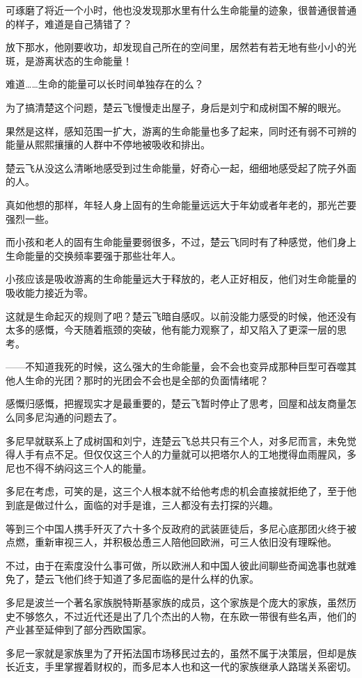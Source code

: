 可琢磨了将近一个小时，他也没发现那水里有什么生命能量的迹象，很普通很普通的样子，难道是自己猜错了？

放下那水，他刚要收功，却发现自己所在的空间里，居然若有若无地有些小小的光斑，是游离状态的生命能量！

难道……生命的能量可以长时间单独存在的么？

为了搞清楚这个问题，楚云飞慢慢走出屋子，身后是刘宁和成树国不解的眼光。

果然是这样，感知范围一扩大，游离的生命能量也多了起来，同时还有弱不可辨的能量从熙熙攘攘的人群中不停地被吸收和排出。

楚云飞从没这么清晰地感受到过生命能量，好奇心一起，细细地感受起了院子外面的人。

真如他想的那样，年轻人身上固有的生命能量远远大于年幼或者年老的，那光芒要强烈一些。

而小孩和老人的固有生命能量要弱很多，不过，楚云飞同时有了种感觉，他们身上生命能量的交换频率要强于那些壮年人。

小孩应该是吸收游离的生命能量远大于释放的，老人正好相反，他们对生命能量的吸收能力接近为零。

这就是生命起灭的规则了吧？楚云飞暗自感叹。以前没能力感受的时候，他还没有太多的感慨，今天随着瓶颈的突破，他有能力观察了，却又陷入了更深一层的思考。

——不知道我死的时候，这么强大的生命能量，会不会也变异成那种巨型可吞噬其他人生命的光团？那时的光团会不会也是全部的负面情绪呢？

感慨归感慨，把握现实才是最重要的，楚云飞暂时停止了思考，回屋和战友商量怎么同多尼沟通的问题去了。

多尼早就联系上了成树国和刘宁，连楚云飞总共只有三个人，对多尼而言，未免觉得人手有点不足。但仅仅这三个人的力量就可以把塔尔人的工地搅得血雨腥风，多尼也不得不纳闷这三个人的能量。

多尼在考虑，可笑的是，这三个人根本就不给他考虑的机会直接就拒绝了，至于他到底是做过什么，面临的对手是谁，三人都没有去打探的兴趣。

等到三个中国人携手歼灭了六十多个反政府的武装匪徒后，多尼心底那团火终于被点燃，重新审视三人，并积极怂恿三人陪他回欧洲，可三人依旧没有理睬他。

不过，由于在索度没什么事可做，所以欧洲人和中国人彼此间聊些奇闻逸事也就难免了，楚云飞他们终于知道了多尼面临的是什么样的仇家。

多尼是波兰一个著名家族脱特斯基家族的成员，这个家族是个庞大的家族，虽然历史不够悠久，不过近代还是出了几个杰出的人物，在东欧一带很有些名声，他们的产业甚至延伸到了部分西欧国家。

多尼一家就是家族里为了开拓法国市场移民过去的，虽然不属于决策层，但却是族长近支，手里掌握着财权的，而多尼本人也和这一代的家族继承人路瑞关系密切。

